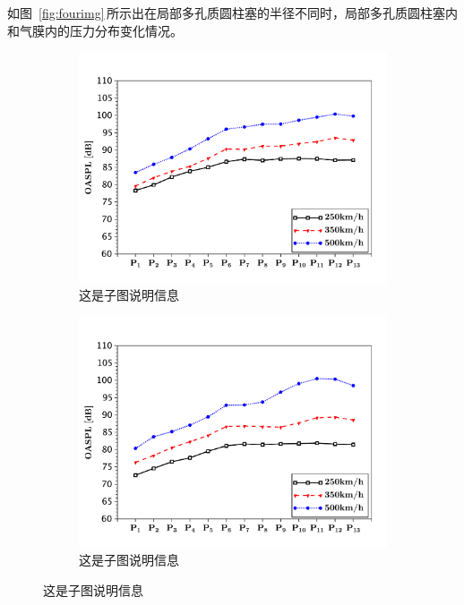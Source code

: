 如图~\ref{fig:fourimg}\,所示出在局部多孔质圆柱塞的半径不同时，局部多孔质圆柱塞内和气膜内的压力分布变化情况。

\begin{figure}[H]
    \centering
    \begin{subfigure}{.4\textwidth}
        \centering
        \includegraphics[width=\textwidth]{img/oaspl_a.pdf}
        \caption{{\songti{}这是子图说明信息}}
    \end{subfigure}
    \quad
    \begin{subfigure}{.4\textwidth}
        \centering
        \includegraphics[width=\textwidth]{img/oaspl_b.pdf}
        \caption{{\songti{}这是子图说明信息}}
    \end{subfigure}


\end{figure}
